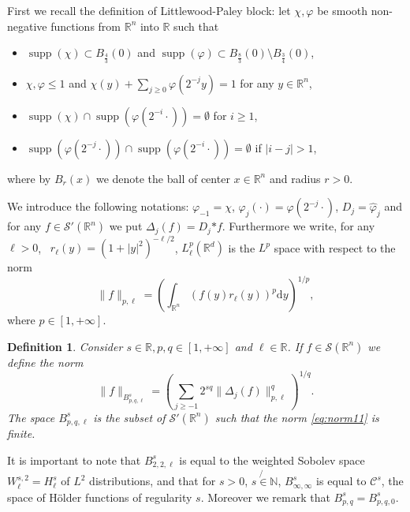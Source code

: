 \documentclass[a4paper,10pt]{article}
\newcommand{\asterisk}{\mathord{*}}
\newcommand{\mathd}{\mathrm{d}}
\newcommand{\tmop}[1]{\ensuremath{\operatorname{#1}}}
\newtheorem{definition}[theorem]{Definition}
\begin{document}
First we recall the definition of Littlewood-Paley block: let $\chi, \varphi$
be smooth non-negative functions from $\mathbb{R}^n$ into $\mathbb{R}$ such
that
\begin{itemize}
  \item $\tmop{supp} (\chi) \subset B_{\frac{4}{3}} (0)$ and $\tmop{supp}
  (\varphi) \subset B_{\frac{8}{3}} (0) \setminus B_{\frac{3}{4}} (0)$,
  
  \item $\chi, \varphi \leq 1$ and $\chi (y) + \sum_{j \geq 0} \varphi (2^{-
  j} y) = 1$ for any $y \in \mathbb{R}^n$,
  
  \item $\tmop{supp} (\chi) \cap \tmop{supp} (\varphi (2^{- i} \cdot)) =
  \emptyset$ for $i \geqslant 1$,
  
  \item $\tmop{supp} (\varphi (2^{- j} \cdot)) \cap \tmop{supp} (\varphi (2^{-
  i} \cdot)) = \emptyset$ if $| i - j | > 1$,
\end{itemize}
where by $B_r (x)$ we denote the ball of center $x \in \mathbb{R}^n$ and
radius $r > 0$.

We introduce the following notations: $\varphi_{- 1} = \chi$, $\varphi_j
(\cdot) = \varphi (2^{- j} \cdot)$, $D_j = \hat{\varphi}_j$ and for any $f \in
\mathcal{S}' (\mathbb{R}^n)$ we put $\Delta_j (f) = D_j \asterisk f$.
Furthermore we write, for any $\ell > 0$, \ $r_{\ell} (y) = (1 + | y |^2)^{-
\ell / 2}$, $L^p_{\ell} (\mathbb{R}^d)$ is the $L^p$ space with respect to the
norm
\[ \| f \|_{p, \ell} = \left( \int_{\mathbb{R}^n} (f (y) r_{\ell} (y))^p
   \mathd y \right)^{1 / p}, \]
where $p \in [1, + \infty]$.

\begin{definition}
  \label{definition_Besov}Consider $s \in \mathbb{R}, p, q \in [1, + \infty]$
  and $\ell \in \mathbb{R}$. If $f \in \mathcal{S} (\mathbb{R}^n)$ we define
  the norm
  \begin{equation}
    \| f \|_{B^s_{p, q, \ell}} = \left( \sum_{j \geq - 1} 2^{s q} \| \Delta_j
    (f) \|_{p, \ell}^q \right)^{1 / q} . \label{eq:norm11}
  \end{equation}
  The space $B^s_{p, q, \ell}$ is the subset of $\mathcal{S}' (\mathbb{R}^n)$
  such that the norm {\eqref{eq:norm11}} is finite. 
\end{definition}

\begin{remark}
  It is important to note that $B^s_{2, 2, \ell}$ is equal to the weighted
  Sobolev space $W^{s, 2}_{\ell} = H^s_{\ell}$ of $L^2$ distributions, and
  that for $s > 0$, $s \not{\in} \mathbb{N}$, $B^s_{\infty, \infty}$ is equal
  to $\mathcal{C}^s$, the space of H{\"o}lder functions of regularity $s$.
  Moreover we remark that $B^s_{p, q} = B^s_{p, q, 0}$.
\end{remark}
\end{document}
